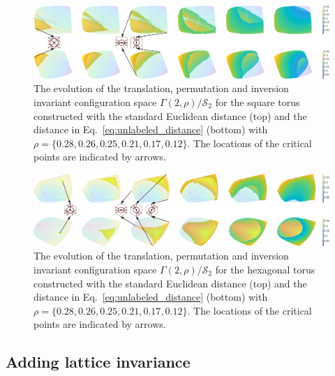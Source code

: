 \documentclass[default,iicol]{sn-jnl}%
\theoremstyle{thmstyleone}%
\theoremstyle{thmstyletwo}%
\theoremstyle{thmstylethree}%
\begin{document}
\begin{figure}
	\centering
	\includegraphics[width=1.0\textwidth]{figure10.eps}
	\caption{The evolution of the translation, permutation and inversion invariant configuration space $\Gamma(2, \rho) / \mathcal{S}_2$ for the square torus constructed with the standard Euclidean distance (top) and the distance in Eq.\ \ref{eq:unlabeled_distance} (bottom) with $\rho = \{0.28, 0.26, 0.25, 0.21, 0.17, 0.12\}$. The locations of the critical points are indicated by arrows.}
	\label{fig:figure10}
\end{figure}

\begin{figure}
	\centering
	\includegraphics[width=1.0\textwidth]{figure11.eps}
	\caption{The evolution of the translation, permutation and inversion invariant configuration space $\Gamma(2, \rho) / \mathcal{S}_2$ for the hexagonal torus constructed with the standard Euclidean distance (top) and the distance in Eq.\ \ref{eq:unlabeled_distance} (bottom) with $\rho = \{0.28, 0.26, 0.25, 0.21, 0.17, 0.12\}$. The locations of the critical points are indicated by arrows.}
	\label{fig:figure11}
\end{figure}


\subsection{Adding lattice invariance}
\label{subsec:space_translation_permutation_inversion_rotation}
\end{document}
